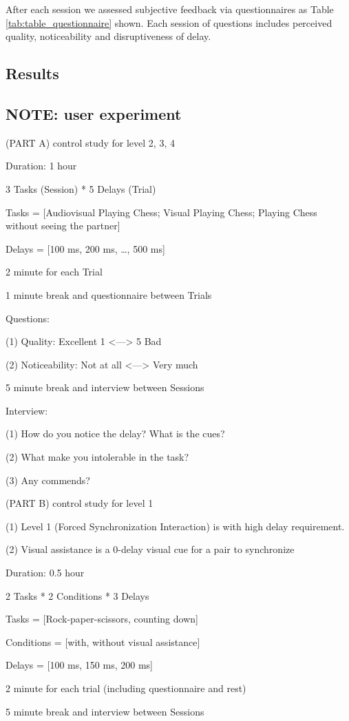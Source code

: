 After each session we assessed subjective feedback via questionnaires as Table \ref{tab:table_questionnaire} shown. Each session of questions includes perceived quality, noticeability and disruptiveness of delay.

\subsection{Results}

\subsection{NOTE: user experiment}

(PART A) control study for level 2, 3, 4

Duration: 1 hour

3 Tasks (Session) * 5 Delays (Trial)

Tasks = [Audiovisual Playing Chess; Visual Playing Chess; Playing Chess without seeing the partner]

Delays = [100 ms, 200 ms, …, 500 ms]

2 minute for each Trial

1 minute break and questionnaire between Trials

Questions:

(1) Quality: Excellent 1 <—> 5 Bad

(2) Noticeability: Not at all <—> Very much

5 minute break and interview between Sessions

Interview:

(1) How do you notice the delay? What is the cues?

(2) What make you intolerable in the task?

(3) Any commends?

(PART B) control study for level 1

(1) Level 1 (Forced Synchronization Interaction) is with high delay requirement.

(2) Visual assistance is a 0-delay visual cue for a pair to synchronize

Duration: 0.5 hour

2 Tasks * 2 Conditions * 3 Delays

Tasks = [Rock-paper-scissors, counting down]

Conditions = [with, without visual assistance]

Delays = [100 ms, 150 ms, 200 ms]

2 minute for each trial (including questionnaire and rest)

5 minute break and interview between Sessions